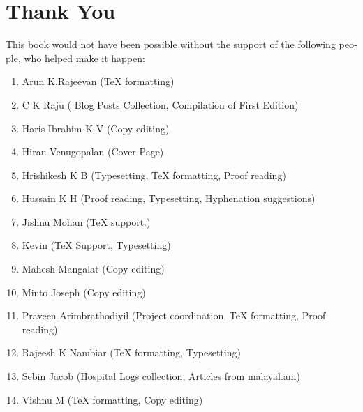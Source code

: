 \section*{Thank You}
\begin{english}
This book would not have been possible without the support of the following 
people, who helped make it happen:
\begin{enumerate}
 \itemsep0em
 \item Arun K.Rajeevan ({\TeX} formatting)
 \item C K Raju ( Blog Posts Collection, Compilation of First Edition)
 \item Haris Ibrahim K V (Copy editing)
 \item Hiran Venugopalan (Cover Page)
 \item Hrishikesh K B (Typesetting, {\TeX} formatting, Proof reading)
 \item Hussain K H (Proof reading, Typesetting, Hyphenation suggestions)
 \item Jishnu Mohan ({\TeX} support.)
 \item Kevin ({\TeX} Support, Typesetting)
 \item Mahesh Mangalat (Copy editing)
 \item Minto Joseph (Copy editing)
 \item Praveen Arimbrathodiyil (Project coordination, {\TeX} formatting, Proof reading)
 \item Rajeesh K Nambiar ({\TeX} formatting, Typesetting)
 \item Sebin Jacob (Hospital Logs collection, Articles from \url{malayal.am})
 \item Vishnu M ({\TeX} formatting, Copy editing)
 
\end{enumerate}
\end{english}
\newpage
